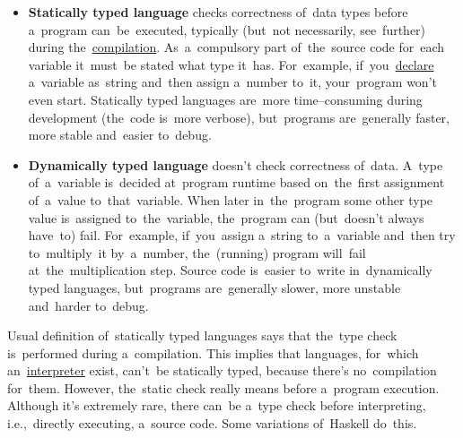 \begin{itemize}
    \item \textbf{Statically typed language} checks correctness of~data types before a~program can~be~executed, typically (but~not necessarily, see~further) during the~\hyperref[compiledinterpretedlanguages]{compilation}.
          As~a~compulsory part of~the~source code for~each variable it~must~be stated what type it~has.
          For~example, if~you~\hyperref[declarationdefinition]{declare} a~variable as~string and~then assign a~number to~it, your~program won't even start.
          Statically typed languages are~more time--consuming during development (the~code is~more verbose), but~programs are~generally faster, more stable and~easier to~debug.
    \item \textbf{Dynamically typed language} doesn't check correctness of~data.
          A~type of~a~variable is~decided at~program runtime based on~the~first assignment of~a~value to~that~variable.
When later in~the~program some other type value is~assigned to~the~variable, the~program can (but~doesn't always have~to) fail.
For~example, if~you~assign a~string to~a~variable and~then try to~multiply~it by~a~number, the~(running) program will~fail at~the~multiplication step.
Source code is~easier to~write in~dynamically typed languages, but~programs are~generally slower, more unstable and~harder to~debug.
\end{itemize}

\warning Usual definition of~statically typed languages says that the~type check is~performed during a~compilation.
This implies that languages, for~which an~\hyperref[compiledinterpretedlanguages]{interpreter} exist, can't~be statically typed, because there's no~compilation for~them.
However, the~static check really means before a~program execution.
Although it's extremely rare, there can~be a~type check before interpreting, i.e.,~directly executing, a~source code.
Some variations of~Haskell do~this.


